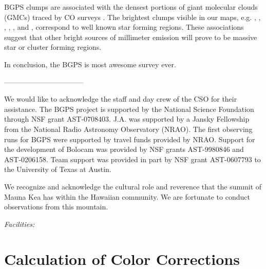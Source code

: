 \documentclass[12pt,preprint]{aastex}
\begin{document}
BGPS clumps are associated with the densest portions of giant
molecular clouds (GMCs) traced by CO surveys
\citep[e.g.,][]{dame01,jackson06}.  The brightest clumps visible in our
maps, e.g. , , ,
, , and , correspond to well
known star forming regions.
These associations suggest that other bright sources of millimeter
emission will prove to be massive star or cluster forming regions.

In conclusion, the BGPS is most awesome survey ever.

\noindent---------------------------------

\acknowledgments

We would like to acknowledge the staff and day crew of the CSO for their
assistance. The BGPS project is supported by the National Science Foundation
through NSF grant AST-0708403. J.A. was supported by a Jansky Fellowship from
the National Radio Astronomy Observatory (NRAO). The first observing runs for
BGPS were supported by travel funds provided by NRAO. Support for the
development of Bolocam was provided by NSF grants AST-9980846 and AST-0206158.
Team support was provided in part by NSF grant AST-0607793 to the
University of Texas at Austin.

We recognize and acknowledge the cultural role and reverence that the
summit of Mauna Kea has within the Hawaiian community. We are
fortunate to conduct observations from this mountain.

{\it Facilities:} 

\appendix

\section{Calculation of Color Corrections}
\label{app:ColorCorrections}
\end{document}
